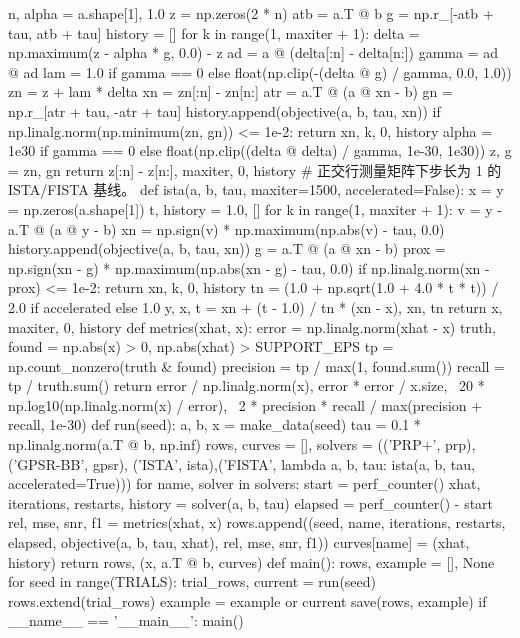 \documentclass{JXUSTmodeling}
\begin{document}
\begin{appendixx}
\begin{python}[
	frame=single,
	breaklines=true,
	breakatwhitespace=false,
	caption={prob3\_SLSQP.py},
	label={lst:constant}
	]
    n, alpha = a.shape[1], 1.0
    z = np.zeros(2 * n)
    atb = a.T @ b
    g = np.r_[-atb + tau, atb + tau]
    history = []
    for k in range(1, maxiter + 1):
        delta = np.maximum(z - alpha * g, 0.0) - z
        ad = a @ (delta[:n] - delta[n:])
        gamma = ad @ ad
        lam = 1.0 if gamma == 0 else float(np.clip(-(delta @ g) / gamma, 0.0, 1.0))
        zn = z + lam * delta
        xn = zn[:n] - zn[n:]
        atr = a.T @ (a @ xn - b)
        gn = np.r_[atr + tau, -atr + tau]
        history.append(objective(a, b, tau, xn))
        if np.linalg.norm(np.minimum(zn, gn)) <= 1e-2:
            return xn, k, 0, history
        alpha = 1e30 if gamma == 0 else float(np.clip((delta @ delta) / gamma, 1e-30, 1e30))
        z, g = zn, gn
    return z[:n] - z[n:], maxiter, 0, history
# 正交行测量矩阵下步长为 1 的 ISTA/FISTA 基线。
def ista(a, b, tau, maxiter=1500, accelerated=False):
    x = y = np.zeros(a.shape[1])
    t, history = 1.0, []
    for k in range(1, maxiter + 1):
        v = y - a.T @ (a @ y - b)
        xn = np.sign(v) * np.maximum(np.abs(v) - tau, 0.0)
        history.append(objective(a, b, tau, xn))
        g = a.T @ (a @ xn - b)
        prox = np.sign(xn - g) * np.maximum(np.abs(xn - g) - tau, 0.0)
        if np.linalg.norm(xn - prox) <= 1e-2:
            return xn, k, 0, history
        tn = (1.0 + np.sqrt(1.0 + 4.0 * t * t)) / 2.0 if accelerated else 1.0
        y, x, t = xn + (t - 1.0) / tn * (xn - x), xn, tn
    return x, maxiter, 0, history
def metrics(xhat, x):
    error = np.linalg.norm(xhat - x)
    truth, found = np.abs(x) > 0, np.abs(xhat) > SUPPORT_EPS
    tp = np.count_nonzero(truth & found)
    precision = tp / max(1, found.sum())
    recall = tp / truth.sum()
    return error / np.linalg.norm(x), error * error / x.size, \
        20 * np.log10(np.linalg.norm(x) / error), \
        2 * precision * recall / max(precision + recall, 1e-30)
def run(seed):
    a, b, x = make_data(seed)
    tau = 0.1 * np.linalg.norm(a.T @ b, np.inf)
    rows, curves = [], {}
    solvers = (('PRP+', prp), ('GPSR-BB', gpsr), ('ISTA', ista),('FISTA', lambda a, b, tau: ista(a, b, tau, accelerated=True)))
    for name, solver in solvers:
        start = perf_counter()
        xhat, iterations, restarts, history = solver(a, b, tau)
        elapsed = perf_counter() - start
        rel, mse, snr, f1 = metrics(xhat, x)
        rows.append((seed, name, iterations, restarts, elapsed,
                     objective(a, b, tau, xhat), rel, mse, snr, f1))
        curves[name] = (xhat, history)
    return rows, (x, a.T @ b, curves)
def main():
    rows, example = [], None
    for seed in range(TRIALS):
        trial_rows, current = run(seed)
        rows.extend(trial_rows)
        example = example or current
    save(rows, example)
if __name__ == '__main__':
    main()
\end{python}


\end{appendixx}
\end{document}
